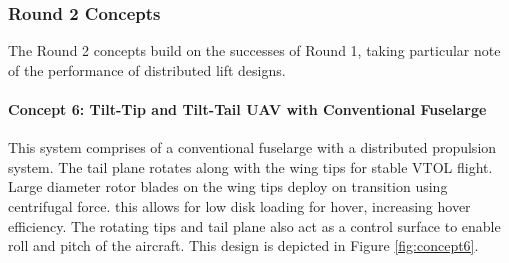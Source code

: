 



\subsubsection{Round 2 Concepts}
The Round 2 concepts build on the successes of Round 1, taking particular note of the performance of distributed lift designs.


\paragraph{Concept 6: Tilt-Tip and Tilt-Tail UAV with Conventional Fuselarge}
This system comprises of a conventional fuselarge with a distributed propulsion system. The tail plane rotates along with the wing tips for stable VTOL flight. Large diameter rotor blades on the wing tips deploy on transition using centrifugal force. this allows for low disk loading for hover, increasing hover efficiency. The rotating tips and tail plane also act as a control surface to enable roll and pitch of the aircraft. This design is depicted in Figure \ref{fig:concept6}.


